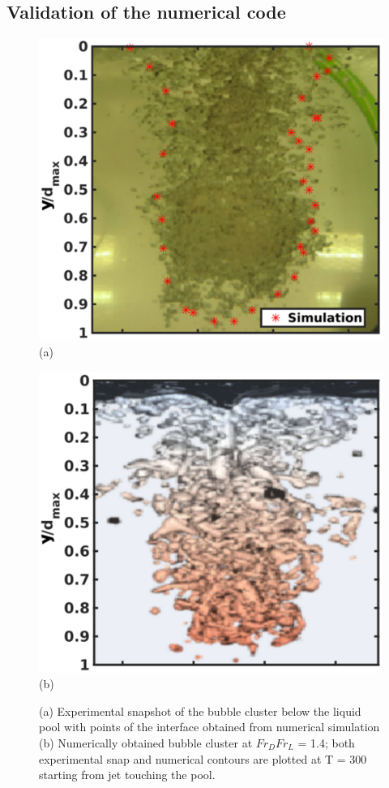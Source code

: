 \subsection{Validation of the numerical code}
\begin{figure}
	\begin{minipage}{0.5\linewidth}
		\centering
		\includegraphics[width=\linewidth]{chapters/jetPool/Figure6a}
		(a)
	\end{minipage}
	\begin{minipage}{0.5\linewidth}
		\centering
		\includegraphics[width=\linewidth]{chapters/jetPool/Figure6b}
		(b)
	\end{minipage}
	\caption{(a) Experimental snapshot of the bubble cluster below the liquid pool with points of the interface obtained from numerical simulation (b) Numerically obtained bubble cluster at $Fr_DFr_L$ = 1.4; both experimental snap and numerical contours are plotted at T = 300 starting from jet touching the pool.}
	\label{Figure::valid}
\end{figure}

